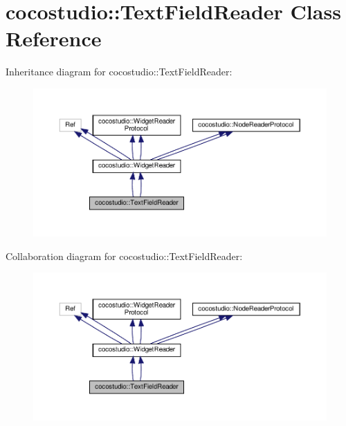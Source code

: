\hypertarget{classcocostudio_1_1TextFieldReader}{}\section{cocostudio\+:\+:Text\+Field\+Reader Class Reference}
\label{classcocostudio_1_1TextFieldReader}


Inheritance diagram for cocostudio\+:\+:Text\+Field\+Reader\+:
\nopagebreak
\begin{figure}[H]
\begin{center}
\leavevmode
\includegraphics[width=350pt]{classcocostudio_1_1TextFieldReader__inherit__graph}
\end{center}
\end{figure}


Collaboration diagram for cocostudio\+:\+:Text\+Field\+Reader\+:
\nopagebreak
\begin{figure}[H]
\begin{center}
\leavevmode
\includegraphics[width=350pt]{classcocostudio_1_1TextFieldReader__coll__graph}
\end{center}
\end{figure}
